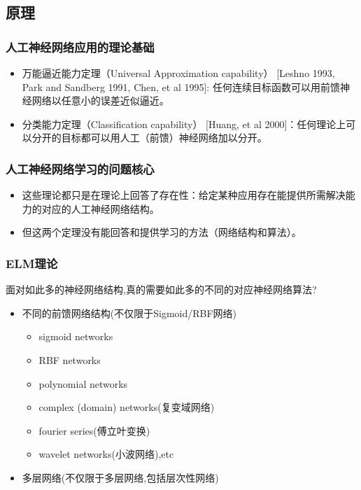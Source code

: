 \documentclass[UTF8,a4paper]{ctexart}%
\begin{document}
      \subsection{原理}
          \subsubsection{人工神经网络应用的理论基础}
              \begin{itemize}
                \item 万能逼近能力定理（Universal Approximation capability） [Leshno 1993, Park and Sandberg 1991, Chen, et al 1995]: 任何连续目标函数可以用前馈神经网络以任意小的误差近似逼近。
                \item 分类能力定理（Classification capability） [Huang, et al 2000]：任何理论上可以分开的目标都可以用人工（前馈）神经网络加以分开。
              \end{itemize}
          \subsubsection{人工神经网络学习的问题核心}
              \begin{itemize}
                \item 这些理论都只是在理论上回答了存在性：给定某种应用存在能提供所需解决能力的对应的人工神经网络结构。
                \item 但这两个定理没有能回答和提供学习的方法（网络结构和算法）。
              \end{itemize}

          \subsubsection{ELM理论}
              面对如此多的神经网络结构,真的需要如此多的不同的对应神经网络算法?
              \begin{itemize}
                \item 不同的前馈网络结构(不仅限于Sigmoid/RBF网络)
                    \begin{itemize}
                      \item sigmoid networks
                      \item RBF networks
                      \item polynomial networks
                      \item complex (domain) networks(复变域网络)
                      \item fourier series(傅立叶变换)
                      \item wavelet networks(小波网络),etc
                    \end{itemize}
                  \item 多层网络(不仅限于多层网络,包括层次性网络)
              \end{itemize}
\end{document}
